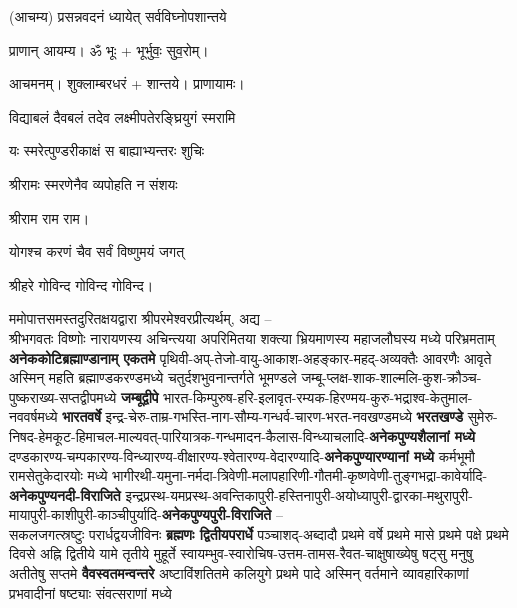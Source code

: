
\setlength{\parindent}{0pt}

\begin{center}
(आचम्य) 
{प्रसन्नवदनं ध्यायेत् सर्वविघ्नोपशान्तये}
 
प्राणान्  आयम्य।  ॐ भूः + भूर्भुवः॒ सुव॒रोम्।

आचमनम्। शुक्लाम्बरधरं + शान्तये। प्राणायामः।


{विद्याबलं दैवबलं तदेव लक्ष्मीपतेरङ्घ्रियुगं स्मरामि}

{यः स्मरेत्पुण्डरीकाक्षं स बाह्याभ्यन्तरः शुचिः}

{श्रीरामः स्मरणेनैव व्यपोहति न संशयः}

श्रीराम राम राम।

{योगश्च करणं चैव सर्वं विष्णुमयं जगत्}

श्रीहरे गोविन्द गोविन्द गोविन्द।

\end{center}

ममोपात्तसमस्तदुरितक्षयद्वारा श्रीपरमेश्वरप्रीत्यर्थम्, अद्य –\\
श्रीभगवतः विष्णोः नारायणस्य अचिन्त्यया अपरिमितया शक्त्या भ्रियमाणस्य महाजलौघस्य मध्ये 
परिभ्रमताम् \textbf{अनेक\-कोटि\-ब्रह्माण्डा\-नाम् एकतमे}
पृथिवी-अप्-तेजो-वायु-आकाश-अहङ्कार-महद्-अव्यक्तैः आवरणैः आवृते अस्मिन् महति ब्रह्माण्डकरण्डमध्ये
चतुर्दशभुवनान्तर्गते भूमण्डले जम्बू-प्लक्ष-शाक-शाल्मलि-कुश-क्रौञ्च-पुष्कराख्य-सप्तद्वीपमध्ये
\textbf{जम्बूद्वीपे} भारत-किम्पुरुष-हरि-इलावृत-रम्यक-हिरण्मय-कुरु-भद्राश्व-केतुमाल-नववर्षमध्ये \textbf{भारतवर्षे}
इन्द्र-चेरु-ताम्र-गभस्ति-नाग-सौम्य-गन्धर्व-चारण-भरत-नवखण्डमध्ये \textbf{भरतखण्डे}
सुमेरु-निषद-हेमकूट-हिमाचल-माल्यवत्-पारियात्रक-गन्धमादन-कैलास-विन्ध्याचलादि-\textbf{अनेक\-पुण्य\-शैलानां मध्ये}
दण्डकारण्य-चम्पकारण्य-विन्ध्यारण्य-वीक्षारण्य-श्वेतारण्य-वेदारण्यादि-\textbf{अनेक\-पुण्या\-रण्यानां मध्ये}
कर्मभूमौ राम\-सेतु\-केदारयोः मध्ये
भागीरथी-यमुना-नर्मदा-त्रिवेणी-मलापहारिणी-गौतमी-कृष्णवेणी-तुङ्गभद्रा-कावेर्यादि-\textbf{अनेक\-पुण्य\-नदी-विराजिते}
इन्द्रप्रस्थ-यमप्रस्थ-अवन्तिका\-पुरी-हस्तिना\-पुरी-अयोध्या\-पुरी-द्वारका-मथुरा\-पुरी-माया\-पुरी-काशी\-पुरी-काञ्ची\-पुर्यादि-\textbf{अनेक\-पुण्य\-पुरी-विराजिते} –\\
सकलजगत्स्रष्टुः परार्धद्वयजीविनः \textbf{ब्रह्मणः द्वितीयपरार्धे} 
पञ्चाशद्-अब्दादौ प्रथमे वर्षे प्रथमे मासे प्रथमे पक्षे प्रथमे दिवसे अह्नि द्वितीये यामे तृतीये मुहूर्ते
स्वायम्भुव-स्वारोचिष-उत्तम-तामस-रैवत-चाक्षुषाख्येषु षट्सु मनुषु अतीतेषु सप्तमे \textbf{वैवस्वतमन्वन्तरे}
अष्टाविंशतितमे कलियुगे प्रथमे पादे अस्मिन् वर्तमाने व्यावहारिकाणां प्रभवादीनां षष्ट्याः संवत्सराणां मध्ये

